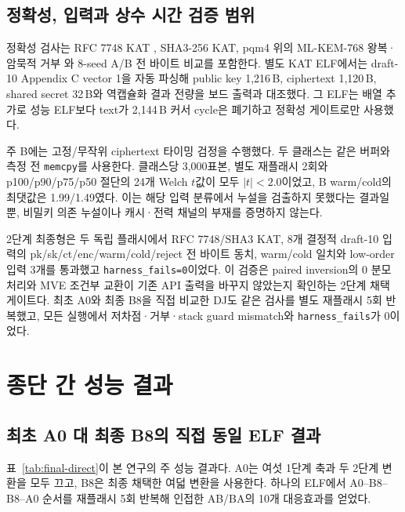 \documentclass[runningheads,orivec]{llncs}
\begin{document}
\subsection{정확성, 입력과 상수 시간 검증 범위}\label{sec:ct}

정확성 검사는 RFC 7748 KAT \cite{RFC7748}, SHA3-256 KAT, pqm4 위의
ML-KEM-768 왕복·암묵적 거부 \cite{FIPS203}와 8-seed A/B 전 바이트 비교를 포함한다.
별도 KAT ELF에서는 draft-10 Appendix C vector 1을 자동 파싱해 public key 1,216\,B,
ciphertext 1,120\,B, shared secret 32\,B와 역캡슐화 결과 전량을 보드 출력과 대조했다.
그 ELF는 배열 추가로 성능 ELF보다 text가 2,144\,B 커서 cycle은 폐기하고 정확성
게이트로만 사용했다.

주 B에는 고정/무작위 ciphertext 타이밍 검정을 수행했다. 두 클래스는 같은 버퍼와
측정 전 \texttt{memcpy}를 사용한다. 클래스당 3,000표본, 별도 재플래시 2회와
p100/p90/p75/p50 절단의 24개 Welch $t$값이 모두 $|t|<2.0$이었고, B warm/cold의
최댓값은 1.99/1.49였다. 이는 해당 입력 분류에서 누설을 검출하지 못했다는 결과일 뿐,
비밀키 의존 누설이나 캐시·전력 채널의 부재를 증명하지 않는다.

2단계 최종형은 두 독립 플래시에서 RFC 7748/SHA3 KAT, 8개 결정적 draft-10 입력의
pk/sk/ct/enc/warm/cold/reject 전 바이트 동치, warm/cold 일치와 low-order 입력 3개를
통과했고 \texttt{harness\_fails=0}이었다. 이 검증은 paired inversion의 0 분모 처리와
MVE 조건부 교환이 기존 API 출력을 바꾸지 않았는지 확인하는 2단계 채택 게이트다.
최초 A0와 최종 B8을 직접 비교한 DJ도 같은 검사를 별도 재플래시 5회 반복했고,
모든 실행에서 저차점·거부·stack guard mismatch와 \texttt{harness\_fails}가 0이었다.

\FloatBarrier
\section{종단 간 성능 결과}\label{sec:results}

\subsection{최초 A0 대 최종 B8의 직접 동일 ELF 결과}\label{sec:final-direct}

표~\ref{tab:final-direct}이 본 연구의 주 성능 결과다. A0는 여섯 1단계 축과 두 2단계
변환을 모두 끄고, B8은 최종 채택한 여덟 변환을 사용한다. 하나의 ELF에서
A0--B8--B8--A0 순서를 재플래시 5회 반복해 인접한 AB/BA의 10개 대응효과를 얻었다.
\end{document}
